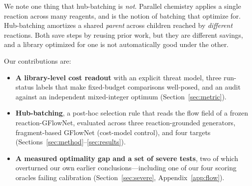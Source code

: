 \documentclass{article}
\begin{document}
We note one thing that hub-batching is \emph{not}. Parallel chemistry applies a single
reaction across many reagents, and is the notion of batching that \citet{fromer2025diversity} optimize for. Hub-batching amortizes a shared \emph{parent}
across children reached by \emph{different} reactions. Both save steps by reusing prior
work, but they are different savings, and a library optimized for one is not automatically good under the other.

Our contributions are:
\begin{itemize}
\itemsep0.15em
\item \textbf{A library-level cost readout} with an explicit threat model, three run-status
      labels that make fixed-budget comparisons well-posed, and an audit against an
      independent mixed-integer optimum (Section~\ref{sec:metric}).
\item \textbf{Hub-batching}, a post-hoc selection rule that reads the flow field of a
      frozen reaction-GFlowNet, evaluated across three reaction-grounded generators, fragment-based GFlowNet (cost-model control), and four targets
      (Sections~\ref{sec:method}--\ref{sec:results}).
\item \textbf{A measured optimality gap and a set of severe tests}, two of which
      overturned our own earlier conclusions---including one of our four scoring oracles
      failing calibration (Section~\ref{sec:severe}, Appendix~\ref{app:flow}).
\end{itemize}
\end{document}

